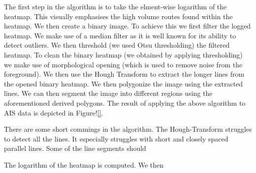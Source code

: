 \documentclass{article}
\begin{document}
The first step in the algorithm is to take the elment-wise logarithm of the heatmap. This visually emphasises the high volume routes found within the heatmap. We then 
create a binary image. To achieve this we first filter the logged heatmap. We make use of a median filter as it is well known for its ability to detect outliers. We then threshold (we used Otsu thresholding) the  
filtered heatmap. To clean the binary heatmap (we obtained by applying thresholding) we make use of morphological opening (which is used to remove noise from the foreground).
We then use the Hough Transform to extract the longer lines from the opened binary heatmap. We then polygonize the image using the extracted lines. We can then 
segment the image into different regions using the aforementioned derived polygons. The result of applying the above algorithm to AIS data is depicted in Figure!\ref{}.


There are some short commings in the algorithm. The Hough-Transform struggles to detect all 
the lines. It especially struggles with short and closely spaced parallel lines. Some of the line segments should 
 
 The logarithm of the heatmap is computed. We then  
\end{document}

